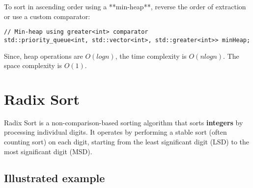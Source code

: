 \documentclass{article}
\begin{document}
To sort in ascending order using a **min-heap**, reverse the order of extraction or use a custom comparator:

\begin{lstlisting}[style=cppstyle]
// Min-heap using greater<int> comparator
std::priority_queue<int, std::vector<int>, std::greater<int>> minHeap;
\end{lstlisting}

Since, heap operations are $O(log n)$, the time complexity is $O(n log n)$. The space complexity is $O(1)$.

\section{Radix Sort}
Radix Sort is a non-comparison-based sorting algorithm that sorts \textbf{integers} by processing individual digits. It operates by performing a stable sort (often counting sort) on each digit, starting from the least significant digit (LSD) to the most significant digit (MSD).

\subsection{Illustrated example}
\end{document}
